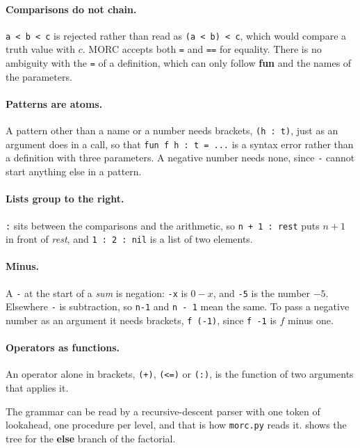 \documentclass[11pt,a4paper]{article}
\theoremstyle{definition}
\theoremstyle{plain}
\newcommand{\kw}[1]{\textbf{#1}}
\newcommand{\nt}[1]{\textit{#1}}
\begin{document}
\paragraph{Comparisons do not chain.} \verb|a < b < c| is rejected rather than
read as \verb|(a < b) < c|, which would compare a truth value with $c$. MORC
accepts both \verb|=| and \verb|==| for equality. There is no ambiguity with
the \verb|=| of a definition, which can only follow \kw{fun} and the names of
the parameters.

\paragraph{Patterns are atoms.} A pattern other than a name or a number
needs brackets, \verb|(h : t)|, just as an argument does in a call, so that
\verb|fun f h : t = ...| is a syntax error rather than a definition with
three parameters. A negative number needs none, since \verb|-| cannot start
anything else in a pattern.

\paragraph{Lists group to the right.} \verb|:| sits between the comparisons
and the arithmetic, so \verb|n + 1 : rest| puts $n+1$ in front of
\textit{rest}, and \verb|1 : 2 : nil| is a list of two elements.

\paragraph{Minus.} A \verb|-| at the start of a \nt{sum} is negation:
\verb|-x| is $0-x$, and \verb|-5| is the number $-5$. Elsewhere \verb|-| is
subtraction, so \verb|n-1| and \verb|n - 1| mean the same. To pass a negative
number as an argument it needs brackets, \verb|f (-1)|, since \verb|f -1| is
$f$ minus one.

\paragraph{Operators as functions.} An operator alone in brackets,
\verb|(+)|, \verb|(<=)| or \verb|(:)|, is the function of two arguments
that applies it.

\medskip
\noindent
The grammar can be read by a recursive-descent parser with one token of
lookahead, one procedure per level, and that is how \texttt{morc.py} reads
it.  shows the tree for the \kw{else} branch of the factorial.
\end{document}
